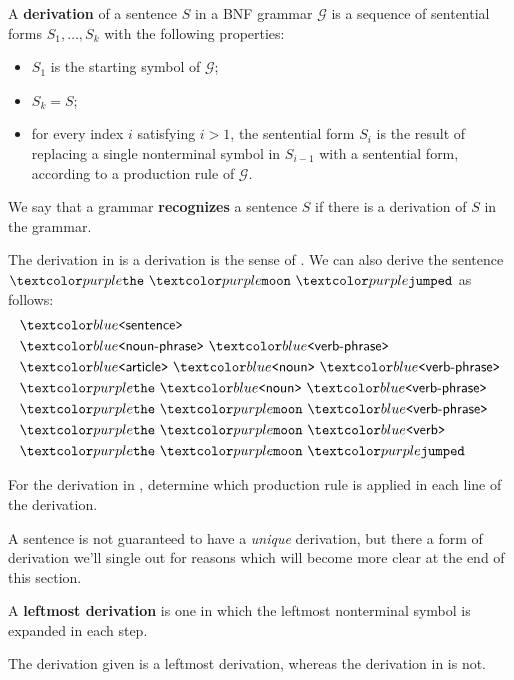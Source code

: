 \begin{definition}
  \label{def:deriv}
  A \textbf{derivation} of a sentence $S$ in a BNF grammar $\mathcal G$ is a sequence of sentential forms $S_1, \dots, S_k$ with the following properties:
  \begin{itemize}
  \item $S_1$ is the starting symbol of $\mathcal G$;
  \item $S_k = S$;
  \item for every index $i$ satisfying $i > 1$, the sentential form $S_i$ is the result of replacing a single nonterminal symbol in $S_{i - 1}$ with a sentential form, according to a production rule of $\mathcal G$.
  \end{itemize}
  We say that a grammar \textbf{recognizes} a sentence $S$ if there is a derivation of $S$ in the grammar.
\end{definition}
%
\begin{example}
  \label{ex:moon-deriv}
  The derivation in  is a derivation is the sense of .
  We can also derive the sentence $\bnft{the} \ \bnft{moon} \ \bnft{jumped}$ as follows:
  \begin{align*}
    & \bnfnt{sentence} \\
    & \bnfnt{noun-phrase} \ \bnfnt{verb-phrase} \\
    & \bnfnt{article} \ \bnfnt{noun} \ \bnfnt{verb-phrase} \\
    & \bnft{the} \ \bnfnt{noun} \ \bnfnt{verb-phrase} \\
    & \bnft{the} \ \bnft{moon} \ \bnfnt{verb-phrase} \\
    & \bnft{the} \ \bnft{moon} \ \bnfnt{verb} \\
    & \bnft{the} \ \bnft{moon} \ \bnft{jumped}
  \end{align*}
\end{example}

\begin{exercise}
  For the derivation in , determine which production rule is applied in each line of the derivation.
\end{exercise}
%
A sentence is not guaranteed to have a \textit{unique} derivation, but there a form of derivation we'll single out for reasons which will become more clear at the end of this section.

\begin{definition}
  A \textbf{leftmost derivation} is one in which the leftmost nonterminal symbol is expanded in each step.
\end{definition}
%
The derivation given  is a leftmost derivation, whereas the derivation in  is not.

